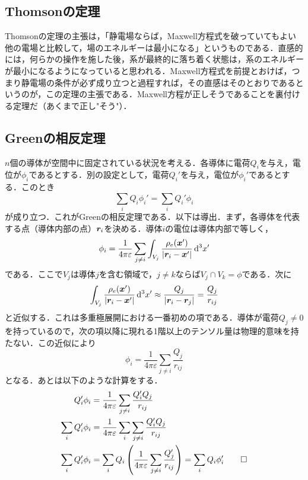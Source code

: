 \documentclass[a4paper,10pt,uplatex]{jsarticle}
\begin{document}
\subsection{Thomsonの定理}
Thomsonの定理の主張は，「静電場ならば，Maxwell方程式を破っていてもよい他の電場と比較して，場のエネルギーは最小になる」というものである．直感的には，何らかの操作を施した後，系が最終的に落ち着く状態は，系のエネルギーが最小になるようになっていると思われる．Maxwell方程式を前提とおけば，つまり静電場の条件が必ず成り立つと過程すれば，その直感はそのとおりであるというのが，この定理の主張である．Maxwell方程が正しそうであることを裏付ける定理だ（あくまで正し"そう"）．

\subsection{Greenの相反定理}
$n$個の導体が空間中に固定されている状況を考える．各導体に電荷$Q_i$を与え，電位が$\phi_i$であるとする．別の設定として，電荷$Q_i'$を与え，電位が$\phi_i'$であるとする．このとき
\begin{equation}
    \sum_{i} Q_i \phi_i' = \sum_{i} Q_i' \phi_i
\end{equation}
が成り立つ．これがGreenの相反定理である．以下は導出．まず，各導体を代表する点（導体内部の点）$\vb*{r}_i$を決める．導体$i$の電位は導体内部で等しく，
\begin{equation}
    \phi_i = \frac{1}{4\pi\varepsilon}\sum_{j\neq i} \int_{V_j} \frac{\rho_e(\vb*{x}')}{|\vb*{r}_i - \vb*{x}'|} \dd[3]{x'}
\end{equation}
である．ここで$V_j$は導体$j$を含む領域で，$j\neq k$ならば$V_j \cap V_k = \phi$である．次に
\begin{equation}
    \int_{V_j} \frac{\rho_e(\vb*{x}')}{|\vb*{r}_i - \vb*{x}'|} \dd[3]{x'} \approx \frac{Q_j}{|\vb*{r}_i - \vb*{r}_j|} = \frac{Q_j}{r_{ij}}
\end{equation}
と近似する．これは多重極展開における一番初めの項である．導体が電荷$Q_j \neq 0$を持っているので，次の項以降に現れる1階以上のテンソル量は物理的意味を持たない．この近似により
\begin{equation}
    \phi_i = \frac{1}{4\pi\varepsilon} \sum_{j\neq i}\frac{Q_j}{r_{ij}}
\end{equation}
となる．あとは以下のような計算をする．
\begin{align}
    Q_i'\phi_i &= \frac{1}{4\pi\varepsilon} \sum_{j\neq i}\frac{Q_i' Q_j}{r_{ij}} \\
    \sum_{i} Q_i' \phi_i &= \frac{1}{4\pi\varepsilon} \sum_{i}\sum_{j\neq i}\frac{Q_i' Q_j}{r_{ij}} \\
    \sum_{i} Q_i' \phi_i &= \sum_{i} Q_i \left(\frac{1}{4\pi\varepsilon} \sum_{j \neq i} \frac{Q_j'}{r_{ij}} \right) = \sum_{i} Q_i \phi_i' \qed
\end{align}
\end{document}
